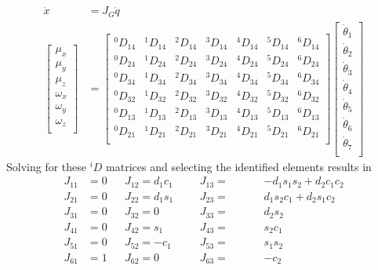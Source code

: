 \documentclass{article}
\begin{document}
\begin{align*}
\dot{x} &= J_G \dot{q} \\
\left[\begin{matrix}
\mu_x \\
\mu_y \\
\mu_z \\
\omega_x \\
\omega_y \\
\omega_z \\
\end{matrix}\right]
&=
\left[\begin{matrix}
^0D_{14} & ^1D_{14} & ^2D_{14} & ^3D_{14} & ^4D_{14} & ^5D_{14} & ^6D_{14} \\
^0D_{24} & ^1D_{24} & ^2D_{24} & ^3D_{24} & ^4D_{24} & ^5D_{24} & ^6D_{24} \\
^0D_{34} & ^1D_{34} & ^2D_{34} & ^3D_{34} & ^4D_{34} & ^5D_{34} & ^6D_{34} \\
^0D_{32} & ^1D_{32} & ^2D_{32} & ^3D_{32} & ^4D_{32} & ^5D_{32} & ^6D_{32} \\
^0D_{13} & ^1D_{13} & ^2D_{13} & ^3D_{13} & ^4D_{13} & ^5D_{13} & ^6D_{13} \\
^0D_{21} & ^1D_{21} & ^2D_{21} & ^3D_{21} & ^4D_{21} & ^5D_{21} & ^6D_{21} \\
\end{matrix}\right]
\left[\begin{matrix}
\dot{\theta}_1 \\
\dot{\theta}_2 \\
\dot{\theta}_3 \\
\dot{\theta}_4 \\
\dot{\theta}_5 \\
\dot{\theta}_6 \\
\dot{\theta}_7 \\
\end{matrix}\right]
\end{align*}
Solving for these $^i D$ matrices and selecting the identified elements results in
\begin{align*}
J_{11} &= 0 && J_{12} = d_{1} c_{1}  &&& J_{13} = &&&& - d_{1} s_{1} s_{2} + d_{2} c_{1} c_{2} \\
J_{21} &= 0 && J_{22} = d_{1} s_{1}  &&& J_{23} = &&&& d_{1} s_{2} c_{1} + d_{2} s_{1} c_{2} \\
J_{31} &= 0 && J_{32} = 0            &&& J_{33} = &&&& d_{2} s_{2} \\
J_{41} &= 0 && J_{42} = s_{1}        &&& J_{43} = &&&& s_{2} c_{1} \\
J_{51} &= 0 && J_{52} = - c_{1}      &&& J_{53} = &&&& s_{1} s_{2} \\
J_{61} &= 1 && J_{62} = 0            &&& J_{63} = &&&& - c_{2} \\
\end{align*}
\end{document}
